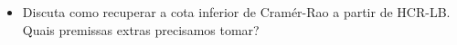 \documentclass[a4paper,10pt, notitlepage]{report}
\newcommand{\vr}{\operatorname{Var}} %
\begin{document}
\begin{enumerate}
\begin{itemize}
        \begin{equation}
            \label{eq:HCR}
            \vr_\theta(\delta) \geq \frac{[g(\theta + \epsilon) - g(\theta)]^2}{E_\theta\left[\left\{L(X) - 1\right\}^2\right]},
        \end{equation}
        que é a cota inferior (ou desigualdade) de Hammersley–Chapman–Robbins (HCR-LB) \footnote{O denominador da expressão é a divergência $\chi^2$ entre $P_{\theta+\epsilon}$ e $P_\theta$.}.
        \item Discuta como recuperar a cota inferior de Cramér-Rao a partir de HCR-LB. Quais premissas extras precisamos tomar?
    \end{itemize}
\end{enumerate}



% 
% 
\end{document}

